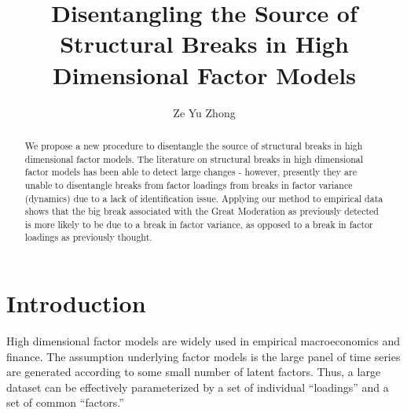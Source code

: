 \documentclass[
]{article}
\title{Disentangling the Source of Structural Breaks in High Dimensional Factor Models}
\author{Ze Yu Zhong}
\date{}
\begin{document}
\maketitle


\newcommand{\sumT}{\sum_{t = 1}^{T}}
\newcommand{\sumTs}{\sum_{s = 1}^{T}}
\newcommand{\sumN}{\sum_{i = 1}^{N}}
\newcommand{\sumNj}{\sum_{j = 1}^{N}}
\newcommand{\convp}{\overset{p}{\to}}
\newcommand{\convd}{\overset{d}{\to}}
\newcommand{\limN}{\lim_{N \to \infty}}
\newcommand{\limT}{\lim_{T \to \infty}}
\newcommand{\plimT}{\operatorname{plim}_{T \to \infty}}
\newcommand{\plimN}{\operatorname{plim}_{N \to \infty}}
\newcommand{\plimNT}{\operatorname{plim}_{N,T \to \infty}}
\newcommand{\ceil}[1]{\left \lceil #1 \right \rceil }
\newcommand{\floor}[1]{\left \lfloor #1 \right \rfloor }
\newcommand{\sumTfloor}{\sum_{t = 1}^{\floor{\tau T}}}
\newcommand{\sumTfloort}{\sum_{t = \floor{\tau T + 1}}^{T}}
\newcommand{\rank}[1]{\operatorname{rank} #1 }
\newcommand{\gt}{>}
\newcommand{\lt}{<}

\begin{abstract}
We propose a new procedure to disentangle the source of structural breaks in high dimensional factor models. The literature on structural breaks in high dimensional factor models has been able to detect large changes - however, presently they are unable to disentangle breaks from factor loadings from breaks in factor variance (dynamics) due to a lack of identification issue. Applying our method to empirical data shows that the big break associated with the Great Moderation as previously detected is more likely to be due to a break in factor variance, as opposed to a break in factor loadings as previously thought.
\end{abstract}

\tableofcontents

\newpage


\section{Introduction}

High dimensional factor models are widely used in empirical macroeconomics and finance. The assumption underlying factor models is the large panel of time series are generated according to some small number of latent factors. Thus, a large dataset can be effectively parameterized by a set of individual ``loadings'' and a set of common ``factors.'' 
\end{document}
